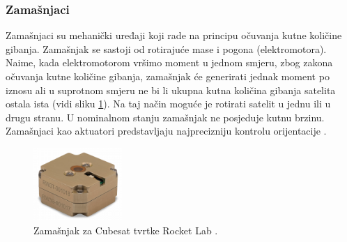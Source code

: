 \documentclass[times, utf8, diplomski, numeric]{templates/template}
\begin{document}
{{{            \subsubsection{Zamašnjaci }{
                Zamašnjaci su mehanički uređaji koji rade na principu očuvanja kutne količine gibanja. Zamašnjak se sastoji od rotirajuće mase i pogona (elektromotora). Naime, kada elektromotorom vršimo moment u jednom smjeru, zbog zakona očuvanja kutne količine gibanja, zamašnjak će generirati jednak moment po iznosu ali u suprotnom smjeru ne bi li ukupna kutna količina gibanja satelita ostala ista (vidi sliku \ref{fig:zamasnjak_fig}). Na taj način moguće je rotirati satelit u jednu ili u drugu stranu. U nominalnom stanju zamašnjak ne posjeduje kutnu brzinu. Zamašnjaci kao aktuatori predstavljaju najprecizniju kontrolu orijentacije \cite{adcsKnjiga}.

                \begin{figure}[htb]
                \centering
                \includegraphics[width=0.3\textwidth]{images/zamasnjak_rocket.png}
                \caption{Zamašnjak za Cubesat tvrtke Rocket Lab \cite{rocket_lab}.}
                \label{fig:zamasnjak_fig}
                \end{figure}

}}}}
\end{document}

